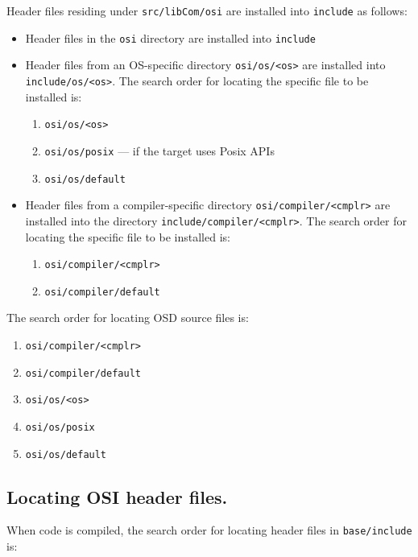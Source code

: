 Header files residing under \verb|src/libCom/osi| are installed into \verb|include| as follows:

\begin{itemize}
\item Header files in the \verb|osi| directory are installed into \verb|include|

\item Header files from an OS-specific directory \verb|osi/os/<os>| are installed into \verb|include/os/<os>|.
The search order for locating the specific file to be installed is:

\begin{enumerate}
\item \verb|osi/os/<os>|
\item \verb|osi/os/posix| --- if the target uses Posix APIs
\item \verb|osi/os/default|
\end{enumerate}

\item Header files from a compiler-specific directory \verb|osi/compiler/<cmplr>| are installed into the directory \verb|include/compiler/<cmplr>|.
The search order for locating the specific file to be installed is:

\begin{enumerate}
\item \verb|osi/compiler/<cmplr>|
\item \verb|osi/compiler/default|
\end{enumerate}

\end{itemize}

The search order for locating OSD source files is:

\begin{enumerate}
\item \verb|osi/compiler/<cmplr>|
\item \verb|osi/compiler/default|
\item \verb|osi/os/<os>|
\item \verb|osi/os/posix|
\item \verb|osi/os/default|
\end{enumerate}

\subsection{Locating OSI header files.}

When code is compiled, the search order for locating header files in \verb|base/include| is:

